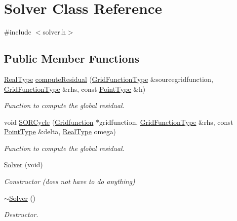 \hypertarget{class_solver}{\section{Solver Class Reference}
\label{d6/d8d/class_solver}
}


{\ttfamily \#include $<$solver.\-h$>$}

\subsection*{Public Member Functions}
\begin{DoxyCompactItemize}
\item 
\hyperlink{typedef_8h_a4071869abd34c628c23e249413e815cf}{Real\-Type} \hyperlink{class_solver_a16fc555b0c285707f05a78e06cceb8df}{compute\-Residual} (\hyperlink{typedef_8h_a8998e93841a5f5b58312b7937c5b6164}{Grid\-Function\-Type} \&sourcegridfunction, \hyperlink{typedef_8h_a8998e93841a5f5b58312b7937c5b6164}{Grid\-Function\-Type} \&rhs, const \hyperlink{typedef_8h_af09038ac7e336d283bb9694a57c0572f}{Point\-Type} \&h)
\begin{DoxyCompactList}\small\item\em Function to compute the global residual. \end{DoxyCompactList}\item 
void \hyperlink{class_solver_a6a185ef99010dc8d2ec7ce2e0a6fc663}{S\-O\-R\-Cycle} (\hyperlink{class_gridfunction}{Gridfunction} $\ast$gridfunction, \hyperlink{typedef_8h_a8998e93841a5f5b58312b7937c5b6164}{Grid\-Function\-Type} \&rhs, const \hyperlink{typedef_8h_af09038ac7e336d283bb9694a57c0572f}{Point\-Type} \&delta, \hyperlink{typedef_8h_a4071869abd34c628c23e249413e815cf}{Real\-Type} omega)
\begin{DoxyCompactList}\small\item\em Function to compute the global residual. \end{DoxyCompactList}\item 
\hyperlink{class_solver_a2f961db30b8037e4ab6df8e914e626ad}{Solver} (void)
\begin{DoxyCompactList}\small\item\em Constructor (does not have to do anything) \end{DoxyCompactList}\item 
\hyperlink{class_solver_aba52d3c92fafceb6fe39f937f2d73db3}{$\sim$\-Solver} ()
\begin{DoxyCompactList}\small\item\em Destructor. \end{DoxyCompactList}\end{DoxyCompactItemize}


